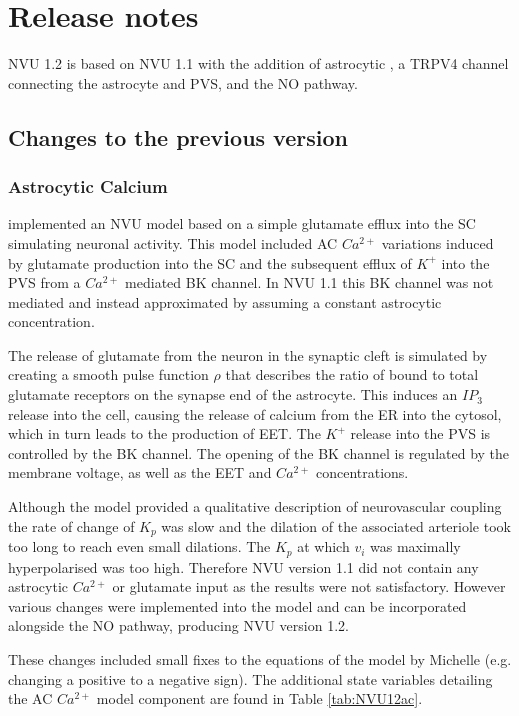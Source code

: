 \section{Release notes}

NVU 1.2 is based on NVU 1.1 with the addition of astrocytic \ca, a TRPV4 channel connecting the astrocyte and PVS, and the NO pathway.

\subsection{Changes to the previous version}

	\subsubsection{Astrocytic Calcium}
	
	\citet{Farr2011} implemented an NVU model based on a simple glutamate efflux into the SC simulating neuronal activity. This model included AC $Ca^{2+}$ variations induced by glutamate production into the SC and the subsequent efflux of $K^+$ into the PVS from a $Ca^{2+}$ mediated BK channel. In NVU 1.1 this BK channel was not \ca mediated and instead approximated by assuming a constant astrocytic \ca concentration.
	
	The release of glutamate from the neuron in the synaptic cleft is simulated by creating a smooth pulse function $\rho$ that describes the ratio of bound to total glutamate receptors on the synapse end of the astrocyte. This induces an $IP_3$ release into the cell, causing the release of calcium from the ER into the cytosol, which in turn leads to the production of EET. The $K^+$ release into the PVS is controlled by the BK channel. The opening of the BK channel is regulated by the membrane voltage, as well as the EET and $Ca^{2+}$ concentrations.
			
	Although the model provided a qualitative description of neurovascular coupling the rate of change of $K_p$ was slow and the dilation of the associated arteriole took too long to reach even small dilations. The $K_p$ at which $v_i$ was maximally hyperpolarised was too high. 
	Therefore NVU version 1.1 did not contain any astrocytic $Ca^{2+}$ or glutamate input as the results were not satisfactory. 
	However various changes were implemented into the model and can be incorporated alongside the NO pathway, producing NVU version 1.2. 
	
	These changes included small fixes to the equations of the model by Michelle (e.g. changing a positive to a negative sign). 
	The additional state variables detailing the AC $Ca^{2+}$ model component are found in Table \ref{tab:NVU12ac}.
	
